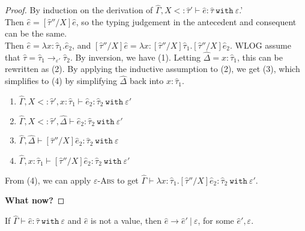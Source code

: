 \documentclass{llncs}
\newcommand{\keywadj}[1]{\mathtt{#1}}
\newcommand{\keyw}[1]{\keywadj{#1}~}
\newcommand{\kw}[1]{\keyw{ #1 }}
\begin{document}
\begin{proof} By induction on the derivation of $\hat \Gamma, X <: \hat \tau' \vdash \hat e: \hat \tau~\kw{with} \varepsilon$.'\\

 Then $\hat e = [\hat \tau''/X]\hat e$, so the typing judgement in the antecedent and consequent can be the same.\\

 Then $\hat e = \lambda x: \hat \tau_1. \hat e_2$, and $[\hat \tau''/X]\hat e = \lambda x: [\hat \tau''/X]\hat \tau_1. [\hat \tau''/X]\hat e_2$. WLOG assume that $\hat \tau = \hat \tau_1 \rightarrow_{\varepsilon'} \hat \tau_2$. By inversion, we have (1). Letting $\hat \Delta = x: \hat \tau_1$, this can be rewritten as (2). By applying the inductive assumption to (2), we get (3), which simplifies to (4) by simplifying $\hat \Delta$ back into $x: \hat \tau_1$.

\begin{enumerate}
	\item $\hat \Gamma, X <: \hat \tau', x: \hat \tau_1 \vdash \hat e_2: \hat \tau_2~\kw{with} \varepsilon'$
	\item $\hat \Gamma, X <: \hat \tau', \hat \Delta \vdash \hat e_2: \hat \tau_2~\kw{with} \varepsilon'$
	\item $\hat \Gamma, \hat \Delta \vdash [\hat \tau''/X]\hat e_2: \hat \tau_2~\kw{with} \varepsilon$
	\item $\hat \Gamma, x : \hat \tau_1 \vdash [\hat \tau''/X]\hat e_2: \hat \tau_2~\kw{with} \varepsilon'$
\end{enumerate}

From (4), we can apply \textsc{$\varepsilon$-Abs} to get $\hat \Gamma \vdash \lambda x: \hat \tau_1. [\hat \tau''/X]\hat e_2: \hat \tau_2~\kw{with} \varepsilon'$.

\textbf{What now?}

\end{proof}



\hrulefill

\begin{theorem}[Progress]
If $\hat \Gamma \vdash \hat e: \hat \tau~\kw{with} \varepsilon$ and $\hat e$ is not a value, then $\hat e \longrightarrow \hat e'~|~\varepsilon$, for some $\hat e', \varepsilon$.
\end{theorem}
\end{document}
